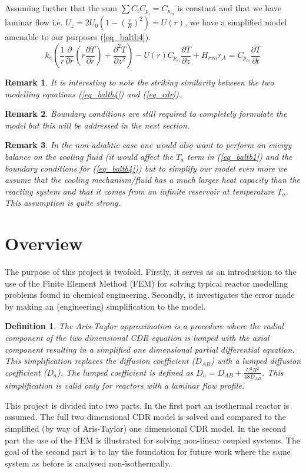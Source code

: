 \documentclass[11pt,fleqn]{article}
\theoremstyle{defstyle}
\newtheorem{defn}{Definition}[section]
\newtheorem{rmrk}{Remark}[section]
\begin{document}
Assuming further that the sum $\sum C_i C_{p_i} = C_{p_m}$ is constant and that we have laminar flow i.e. $U_z = 2U_0(1-(\frac{r}{R})^2) = U(r)$, we have a simplified model amenable to our purposes (\ref{eq_baltb4}).
\begin{equation}
k_e(\frac{1}{r}\frac{\partial}{\partial r}(r\frac{\partial T}{\partial r}) + \frac{\partial ^2 T}{\partial z^2}) - U(r) C_{p_m} \frac{\partial T}{\partial z} + H_{rxn}r_A = C_{p_m} \frac{\partial T}{\partial t}
\label{eq_baltb4}
\end{equation}
\begin{rmrk}
It is interesting to note the striking similarity between the two modelling equations (\ref{eq_baltb4}) and (\ref{eq_cdr}).
\end{rmrk}
\begin{rmrk}
Boundary conditions are still required to completely formulate the model but this will be addressed in the next section.
\end{rmrk}
\begin{rmrk}
In the non-adiabtic case one would also want to perform an energy balance on the cooling fluid (it would affect the $T_a$ term in (\ref{eq_baltb1}) and the boundary conditions for (\ref{eq_baltb4})) but to simplify our model even more we assume that the cooling mechanism/fluid has a much larger heat capacity than the reacting system and that it comes from an infinite reservoir at temperature $T_a$. This assumption is quite strong.
\end{rmrk}

\section{Overview}
The purpose of this project is twofold. Firstly, it serves as an introduction to the use of the Finite Element Method (FEM) for solving typical reactor modelling problems found in chemical engineering. Secondly, it investigates the error made by making an (engineering) simplification to the model.
\begin{defn}
The Aris-Taylor approximation is a procedure where the radial component of the two dimensional CDR equation is lumped with the axial component resulting in a simplified one dimensional partial differential equation. This simplification replaces the diffusion coefficient ($D_{AB}$) with a lumped diffusion coefficient ($D_a$). The lumped coefficient is defined as $D_a = D_{AB} + \frac{U^2R^2}{48D_{AB}}$. This simplification is valid only for reactors with a laminar flow profile. 
\end{defn}
This project is divided into two parts. In the first part an isothermal reactor is assumed. The full two dimensional CDR model is solved and compared to the simplified (by way of Aris-Taylor) one dimensional CDR model. In the second part the use of the FEM is illustrated for solving non-linear coupled systems. The goal of the second part is to lay the foundation for future work where the same system as before is analysed non-isothermally.
\end{document}
